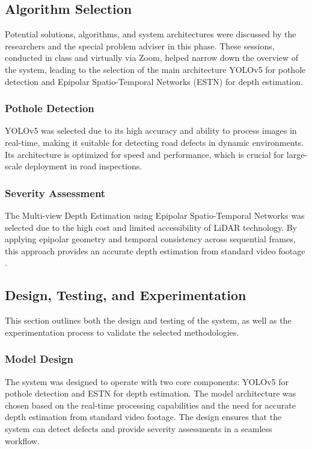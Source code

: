 \subsection{\textbf{Algorithm Selection } }
Potential solutions, algorithms, and system architectures were discussed by the researchers and the special problem adviser in this phase. These sessions, conducted in class and virtually via Zoom, helped narrow down the overview of the system, leading to the selection of the main architecture YOLOv5 for pothole detection and Epipolar Spatio-Temporal Networks (ESTN) for depth estimation. 

\subsubsection{Pothole Detection}
YOLOv5 was selected due to its high accuracy and ability to process images in real-time, making it suitable for detecting road defects in dynamic environments. Its architecture is optimized for speed and performance, which is crucial for large-scale deployment in road inspections. 

\subsubsection{Severity Assessment}
The Multi-view Depth Estimation using Epipolar Spatio-Temporal Networks was selected due to the high cost and limited accessibility of LiDAR technology. By applying epipolar geometry and temporal consistency across sequential frames, this approach provides an accurate depth estimation from standard video footage \cite{long2021}. 

\subsection{\textbf{Design, Testing, and Experimentation} }
This section outlines both the design and testing of the system, as well as the experimentation process to validate the selected methodologies. 

\subsubsection{Model Design}
The system was designed to operate with two core components: YOLOv5 for pothole detection and ESTN for depth estimation. The model architecture was chosen based on the real-time processing capabilities and the need for accurate depth estimation from standard video footage. The design ensures that the system can detect defects and provide severity assessments in a seamless workflow. 

